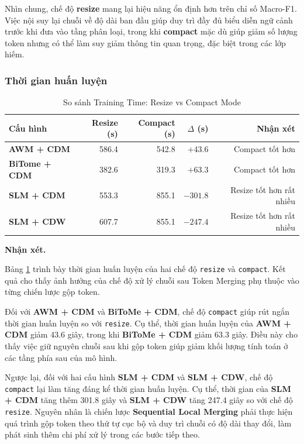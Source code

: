 Nhìn chung, chế độ \textbf{resize} mang lại hiệu năng ổn định hơn
trên chỉ số Macro-F1. Việc nội suy lại chuỗi về độ dài ban đầu giúp
duy trì đầy đủ biểu diễn ngữ cảnh trước khi đưa vào tầng phân loại,
trong khi \textbf{compact} mặc dù giúp giảm số lượng token nhưng có
thể làm suy giảm thông tin quan trọng, đặc biệt trong các lớp hiếm.

\subsubsection*{Thời gian huấn luyện}

\begin{table}[H]
\centering
\small
\caption{So sánh Training Time: Resize vs Compact Mode}
\label{tab:compact_vs_resize_micro}
\begin{tabular}{@{}lrrrr@{}}
\toprule
\textbf{Cấu hình} & \textbf{Resize (s)} & \textbf{Compact (s)} & \textbf{$\Delta$ (s)} & \textbf{Nhận xét} \\
\midrule
\textbf{AWM + CDM}  & 586.4 & 542.8 & $+43.6$ & Compact tốt hơn \\
\textbf{BiTome + CDM}   & 382.6 & 319.3 & $+63.3$ & Compact tốt hơn  \\
\textbf{SLM + CDM}   & 553.3 & 855.1 & $-301.8$ & Resize tốt hơn rất nhiều \\
\textbf{SLM + CDW}   & 607.7 & 855.1 & $-247.4$ & Resize tốt hơn rất nhiều \\
\midrule
\bottomrule
\end{tabular}
\end{table}

\textbf{Nhận xét.}

Bảng \ref{tab:compact_vs_resize_micro} trình bày thời gian huấn luyện của
hai chế độ \texttt{resize} và \texttt{compact}. Kết quả cho thấy ảnh
hưởng của chế độ xử lý chuỗi sau Token Merging phụ thuộc vào từng chiến
lược gộp token.

Đối với \textbf{AWM + CDM} và
\textbf{BiToMe + CDM}, chế độ \texttt{compact} giúp rút ngắn thời
gian huấn luyện so với \texttt{resize}. Cụ thể, thời gian huấn luyện của
\textbf{AWM + CDM} giảm 43.6 giây, trong khi
\textbf{BiToMe + CDM} giảm 63.3 giây. Điều này cho thấy việc giữ nguyên
chuỗi sau khi gộp token giúp giảm khối lượng tính toán ở các tầng phía
sau của mô hình.

Ngược lại, đối với hai cấu hình \textbf{SLM + CDM} và
\textbf{SLM + CDW}, chế
độ \texttt{compact} lại làm tăng đáng kể thời gian huấn luyện.
Cụ thể, thời gian của \textbf{SLM + CDM} tăng thêm 301.8 giây và
\textbf{SLM + CDW} tăng 247.4 giây so với chế độ
\texttt{resize}. Nguyên nhân là chiến lược
\textbf{Sequential Local Merging}
phải thực hiện quá trình gộp token theo thứ tự cục bộ và duy trì chuỗi
có độ dài thay đổi, làm phát sinh thêm chi phí xử lý trong các bước
tiếp theo.

